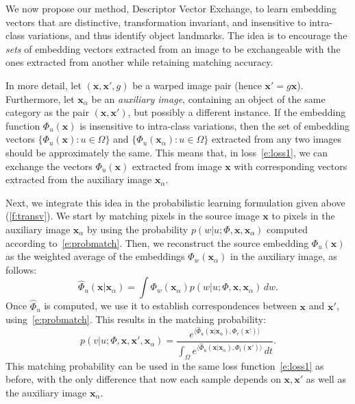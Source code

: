 \documentclass[10pt,twocolumn,letterpaper]{article}
\makeatletter
\newcommand{\bx}{\mathbf{x}}
\newcommand{\Phihat}{{\widehat\Phi}}
\renewcommand{\paragraph}{\@startsection{paragraph}{4}{\z@}{0.5em}{-1em}{\normalfont\normalsize\bfseries}}
\makeatother
\begin{document}
We now propose our method, Descriptor Vector Exchange, to learn embedding vectors that are distinctive, transformation invariant, and insensitive to intra-class variations, and thus identify object landmarks.
The idea is to encourage the \emph{sets} of embedding vectors extracted from an image to be exchangeable with the ones extracted from another while retaining matching accuracy.

In more detail, let $(\bx,\bx',g)$ be a warped image pair (hence $\bx'=g\bx$).
Furthermore, let $\bx_\alpha$ be an \emph{auxiliary image}, containing an object of the same category as the pair $(\bx,\bx')$, but possibly a different instance.
If the embedding function $\Phi_u(\bx)$ is insensitive to intra-class variations, then the set of embedding vectors $\{\Phi_u(\bx):u\in\Omega\}$ and $\{\Phi_u(\bx_\alpha):u\in\Omega\}$ extracted from any two images should be approximately the same.
This means that, in loss~\eqref{e:loss1}, we can exchange the vectors $\Phi_u(\bx)$ extracted from image $\bx$ with corresponding vectors extracted from the auxiliary image $\bx_\alpha$.

Next, we integrate this idea in the probabilistic learning formulation given above (\cref{f:transv}).
We start by matching pixels in the source image $\bx$ to pixels in the auxiliary image $\bx_\alpha$ by using the probability $p(w|u;\Phi,\bx,\bx_\alpha)$ computed according to~\cref{e:probmatch}.
Then, we reconstruct the source embedding $\Phi_u(\bx)$ as the weighted average of the embeddings $\Phi_{w}(\bx_\alpha)$ in the auxiliary image, as follows:
\begin{equation}\label{e:rec}
   \Phihat_u(\bx|\bx_{\alpha})
   =
   \int \Phi_{w}(\bx_\alpha)p(w|u;\Phi,\bx,\bx_\alpha)\,dw.
\end{equation}
Once $\Phihat_u$ is computed, we use it to establish correspondences between $\bx$ and $\bx'$, using~\cref{e:probmatch}.
This results in the matching probability:
\begin{equation}\label{e:probmatch2}
p(v|u;\Phi,\bx,\bx',\bx_\alpha) =
\frac
{e^{\langle\Phihat_u(\bx|\bx_\alpha),\Phi_v(\bx') \rangle}}
{\int_\Omega e^{\langle \Phihat_u(\bx|\bx_\alpha),\Phi_{t}(\bx') \rangle}\,dt}.
\end{equation}
This matching probability can be used in the same loss function~\eqref{e:loss1} as before, with the only difference that now each sample depends on $\bx,\bx'$ as well as the auxiliary image $\bx_\alpha$.

\paragraph{Discussion.}
\end{document}
